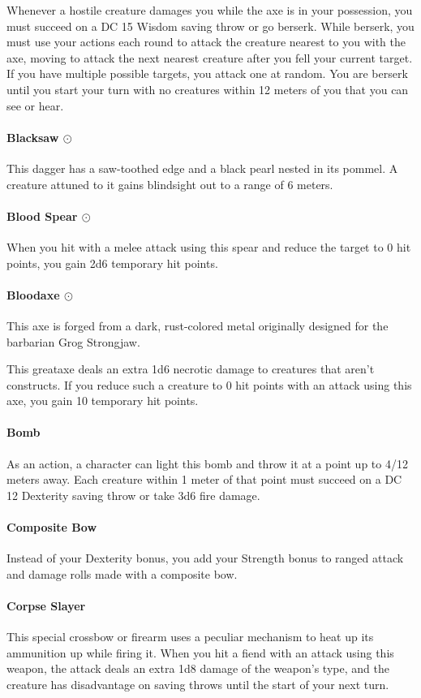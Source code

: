         Whenever a hostile creature damages you while the axe is in your possession, you must succeed on a DC 15 Wisdom saving throw or go berserk.
        While berserk, you must use your actions each round to attack the creature nearest to you with the axe, moving to attack the next nearest creature after you fell your current target.
        If you have multiple possible targets, you attack one at random.
        You are berserk until you start your turn with no creatures within 12 meters of you that you can see or hear.
    \paragraph{Blacksaw $\odot$}
        This dagger has a saw-toothed edge and a black pearl nested in its pommel.
        A creature attuned to it gains blindsight out to a range of 6 meters.
    \paragraph{Blood Spear $\odot$}
        When you hit with a melee attack using this spear and reduce the target to 0 hit points, you gain 2d6 temporary hit points.
    \paragraph{Bloodaxe $\odot$}
        This axe is forged from a dark, rust-colored metal originally designed for the barbarian Grog Strongjaw.

        This greataxe deals an extra 1d6 necrotic damage to creatures that aren't constructs.
        If you reduce such a creature to 0 hit points with an attack using this axe, you gain 10 temporary hit points.
    \paragraph{Bomb}
        As an action, a character can light this bomb and throw it at a point up to 4/12 meters away.
        Each creature within 1 meter of that point must succeed on a DC 12 Dexterity saving throw or take 3d6 fire damage.
    \paragraph{Composite Bow}
        Instead of your Dexterity bonus, you add your Strength bonus to ranged attack and damage rolls made with a composite bow.
    \paragraph{Corpse Slayer}
        This special crossbow or firearm uses a peculiar mechanism to heat up its ammunition up while firing it.
        When you hit a fiend with an attack using this weapon, the attack deals an extra 1d8 damage of the weapon's type, and the creature has disadvantage on saving throws until the start of your next turn.
